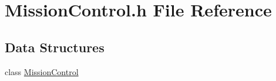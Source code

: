 \hypertarget{a00033}{\section{Mission\-Control.\-h File Reference}
\label{a00033}
}
\subsection*{Data Structures}
\begin{DoxyCompactItemize}
\item 
class \hyperlink{a00010}{Mission\-Control}
\end{DoxyCompactItemize}
